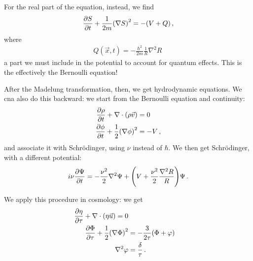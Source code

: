 \documentclass[main.tex]{subfiles}
\begin{document}
For the real part of the equation, instead, we find 
%
\begin{align}
\pdv{S}{t} + \frac{1}{2m} \qty(\nabla S)^2 = - (V + Q ) 
\,,
\end{align}
%
where 
%
\begin{align}
Q ( \vec{x}, t) = - \frac{\hbar^2}{2m} \frac{1}{R} \nabla^2 R 
\,
\end{align}
%
a part we must include in the potential to account for quantum effects. 
This is the effectively the Bernoulli equation! 

After the Madelung transformation, then, we get hydrodynamic equations. 
We cna also do this backward: we start from the Bernoulli equation and continuity: 
%
\begin{subequations}
\begin{align}
\pdv{\rho }{t} + \nabla \cdot \qty(\rho \vec{v}) &= 0  \\
\pdv{\phi }{t} + \frac{1}{2} \qty(\nabla \phi )^2 &= -V 
\,,
\end{align}
\end{subequations}
%
and associate it with Schrödinger, using \(\nu \) instead of \(\hbar\). 
We then get Schrödinger, with a different potential: 
%
\begin{align}
i \nu \pdv{\Psi }{t} = - \frac{\nu^2}{2 } \nabla^2 \Psi + \qty(V + \frac{\nu^2}{2} \frac{\nabla^2 R}{R}) \Psi 
\,.
\end{align}

We apply this procedure in cosmology: we get 
%
\begin{subequations}
\begin{align}
\pdv{\eta }{\tau } + \nabla \cdot \qty(\eta \vec{u}) = 0   \\
\pdv{\Phi  }{\tau } + \frac{1}{2} \qty(\nabla \Phi )^2 &= - \frac{3}{2 \tau } \qty(\Phi + \varphi )  \\
\nabla^2 \varphi &= \frac{\delta}{\tau }
\,.
\end{align}
\end{subequations}
\end{document}
